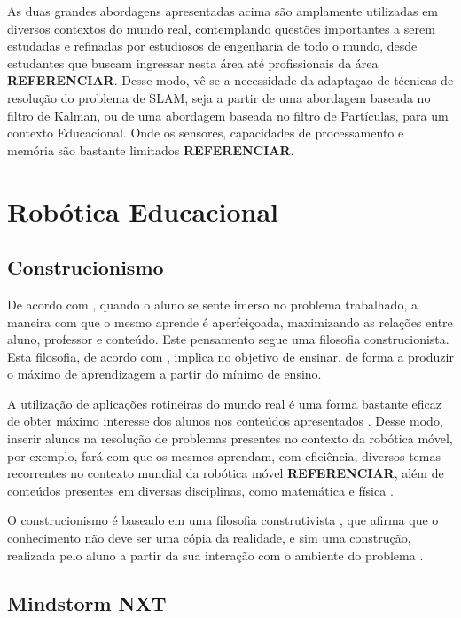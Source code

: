 As duas grandes abordagens apresentadas acima são amplamente utilizadas em diversos contextos do mundo real, contemplando questões importantes a serem estudadas e refinadas por estudiosos de engenharia de todo o mundo, desde estudantes que buscam ingressar nesta área até profissionais da área \textbf{REFERENCIAR}. Desse modo, vê-se a necessidade da adaptaçao de técnicas de resolução do problema de SLAM, seja a partir de uma abordagem baseada no filtro de Kalman, ou de uma abordagem baseada no filtro de Partículas, para um contexto Educacional. Onde os sensores, capacidades de processamento e memória são bastante limitados \textbf{REFERENCIAR}.

\section{Robótica Educacional} %
\label{sec:robótica_educacional}

\subsection{Construcionismo} %
\label{sub:construcionismo}

	De acordo com \cite{construcionismoPapert}, quando o aluno se sente imerso no problema trabalhado, a maneira com que o mesmo aprende é aperfeiçoada, maximizando as relações entre aluno, professor e conteúdo. Este pensamento segue uma filosofia construcionista. Esta filosofia, de acordo com \cite{construcionismoPapert}, implica no objetivo de ensinar, de forma a produzir o máximo de aprendizagem a partir do mínimo de ensino.

	A utilização de aplicações rotineiras do mundo real é uma forma bastante eficaz de obter máximo interesse dos alunos nos conteúdos apresentados \cite{construcionismoPapert}. Desse modo, inserir alunos na resolução de problemas presentes no contexto da robótica móvel, por exemplo, fará com que os mesmos aprendam, com eficiência, diversos temas recorrentes no contexto mundial da robótica móvel \textbf{REFERENCIAR}, além de conteúdos presentes em diversas disciplinas, como matemática e física \cite{roboticaEducacionalAulasMatematica}.

	O construcionismo é baseado em uma filosofia construtivista \cite{construcionismoPapert}, que afirma que o conhecimento não deve ser uma cópia da realidade, e sim uma construção, realizada pelo aluno a partir da sua interação com o ambiente do problema \cite{oQueEConstrutivismo}.

\subsection{Mindstorm NXT} %
\label{sub:kit_mindstorm}

